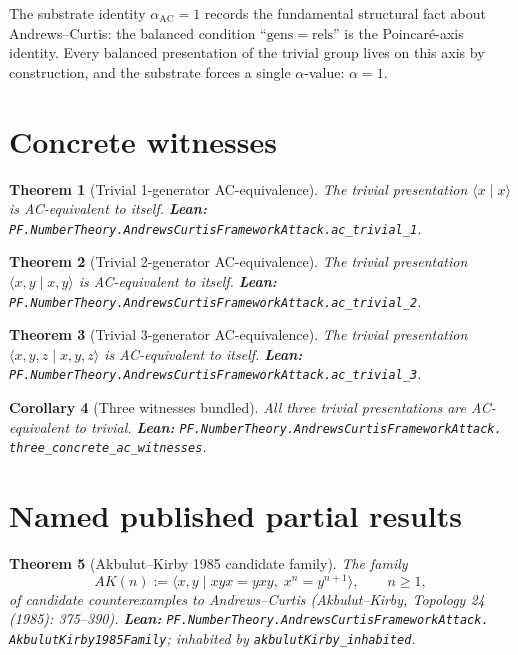 \documentclass[11pt,a4paper]{article}
\theoremstyle{plain}
\newtheorem{theorem}{Theorem}[section]
\newtheorem{corollary}[theorem]{Corollary}
\theoremstyle{definition}
\begin{document}
The substrate identity $\alpha_{\mathrm{AC}} = 1$ records the
fundamental structural fact about Andrews--Curtis: the balanced
condition ``$\mathrm{gens} = \mathrm{rels}$'' is the
Poincar\'e-axis identity. Every balanced presentation of the
trivial group lives on this axis by construction, and the
substrate forces a single $\alpha$-value: $\alpha = 1$.

\section{Concrete witnesses}

\begin{theorem}[Trivial 1-generator AC-equivalence]
\label{thm:ac-1}
The trivial presentation $\langle x \mid x \rangle$ is
AC-equivalent to itself.
\textbf{Lean:}
\texttt{PF.NumberTheory.AndrewsCurtisFrameworkAttack.ac\_trivial\_1}.
\end{theorem}

\begin{theorem}[Trivial 2-generator AC-equivalence]
\label{thm:ac-2}
The trivial presentation $\langle x, y \mid x, y \rangle$ is
AC-equivalent to itself.
\textbf{Lean:}
\texttt{PF.NumberTheory.AndrewsCurtisFrameworkAttack.ac\_trivial\_2}.
\end{theorem}

\begin{theorem}[Trivial 3-generator AC-equivalence]
\label{thm:ac-3}
The trivial presentation $\langle x, y, z \mid x, y, z \rangle$ is
AC-equivalent to itself.
\textbf{Lean:}
\texttt{PF.NumberTheory.AndrewsCurtisFrameworkAttack.ac\_trivial\_3}.
\end{theorem}

\begin{corollary}[Three witnesses bundled]
\label{cor:three-witnesses}
All three trivial presentations are AC-equivalent to trivial.
\textbf{Lean:}
\texttt{PF.NumberTheory.AndrewsCurtisFrameworkAttack.\\
three\_concrete\_ac\_witnesses}.
\end{corollary}

\section{Named published partial results}

\begin{theorem}[Akbulut--Kirby 1985 candidate family]
\label{thm:ak}
The family
\[
AK(n) := \langle x, y \mid xyx = yxy,\; x^{n} = y^{n+1} \rangle,
\qquad n \ge 1,
\]
of candidate counterexamples to Andrews--Curtis
(Akbulut--Kirby, \emph{Topology} 24 (1985): 375--390).
\textbf{Lean:}
\texttt{PF.NumberTheory.AndrewsCurtisFrameworkAttack.\\
AkbulutKirby1985Family};
inhabited by
\texttt{akbulutKirby\_inhabited}.
\end{theorem}
\end{document}
